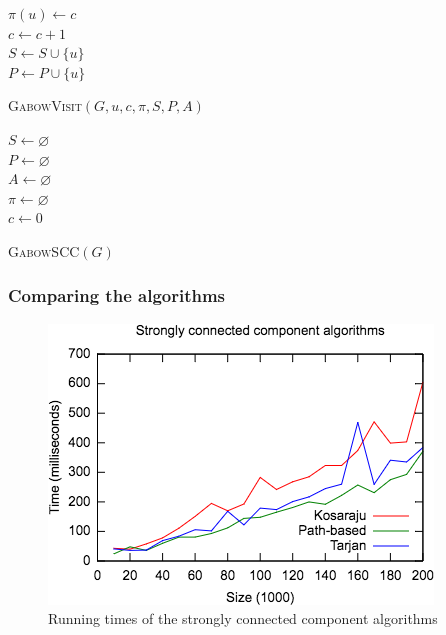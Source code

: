 \documentclass[english]{tktltiki2}
\theoremstyle{definition}
\theoremstyle{remark}
\begin{document}
\begin{algorithm}
$\pi(u) \leftarrow c$ \\
$c \leftarrow c + 1$ \\
$S \leftarrow S \cup \{ u \}$ \\
$P \leftarrow P \cup \{ u \}$ \\
\caption{\textsc{GabowVisit}$(G, u, c, \pi, S, P, A)$}
\label{alg:gabowvisit}
\end{algorithm}

\begin{algorithm}
$S \leftarrow \varnothing$ \\
$P \leftarrow \varnothing$ \\
$A \leftarrow \varnothing$ \\
$\pi \leftarrow \varnothing$ \\
$c \leftarrow 0$ \\
\caption{\textsc{GabowSCC}$(G)$}
\label{alg:gabow}
\end{algorithm}

\subsubsection{Comparing the algorithms}
\begin{figure}
  \centering
  \includegraphics{SCCDataCropped}
  \caption{Running times of the strongly connected component algorithms}
\end{figure}







% 
\end{document}
